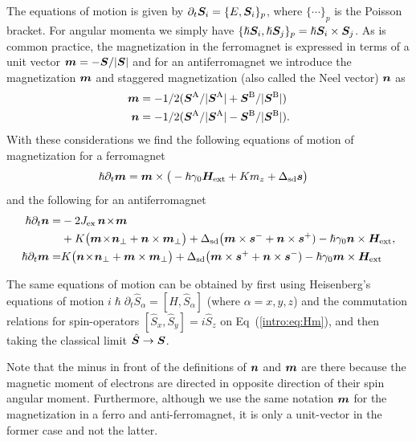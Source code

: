 The equations of motion is given by $\partial_t \boldsymbol{S}_i = \{E,\boldsymbol{S}_i\}_p$, where $\{\cdots\}_p$ is the Poisson bracket. For angular momenta we simply have $\{\hslash \boldsymbol{S}_i,\hslash \boldsymbol{S}_j\}_p=\hslash \boldsymbol{S}_i\times\boldsymbol{S}_j$. As is common practice, the magnetization in the ferromagnet is expressed in terms of a unit vector $\boldsymbol{m} = -\boldsymbol{S}/|\boldsymbol{S}|$ and for an antiferromagnet we introduce the magnetization $\boldsymbol{m}$ and staggered magnetization (also called the Neel vector) $\boldsymbol{n}$ as
\begin{align}
 	\boldsymbol{m}&=-1/2(\boldsymbol{S}^\text{A}/|\boldsymbol{S}^\text{A}|+\boldsymbol{S}^\text{B}/|\boldsymbol{S}^\text{B}|)\\
    \boldsymbol{n}&=-1/2(\boldsymbol{S}^\text{A}/|\boldsymbol{S}^\text{A}|-\boldsymbol{S}^\text{B}/|\boldsymbol{S}^\text{B}|).
\end{align} 
With these considerations we find the following equations of motion of magnetization for a ferromagnet
\begin{align}
	\hslash \partial_t \boldsymbol{m} &= \boldsymbol{m}\times\big(-\hslash\gamma_0\boldsymbol{H}_\text{ext}+Km_z+\Delta_\text{sd}\boldsymbol{s}\big)
	\label{intro:eq:S1}
\end{align}
and the following for an antiferromagnet
\begin{align}
\hslash \partial_t \boldsymbol{n} =& -2J_\text{ex}\, \boldsymbol{n}\!\times\!\boldsymbol{m} \nonumber\\
    & + K \big(\boldsymbol{m}\!\times\!\boldsymbol{n}_\perp+\boldsymbol{n}\times\boldsymbol{m}_\perp\big) 
	+ \Delta_\text{sd} \big(\boldsymbol{m}\times\boldsymbol{s}^-+\boldsymbol{n}\times\boldsymbol{s}^+) -\hslash\gamma_0\boldsymbol{n}\times\boldsymbol{H}_\text{ext},\\
\hslash \partial_t \boldsymbol{m} =&K  \big(\boldsymbol{n}\!\times\!\boldsymbol{n}_\perp+\boldsymbol{m}\times\boldsymbol{m}_\perp\big) 
	+ \Delta_\text{sd} \big(\boldsymbol{m}\times\boldsymbol{s}^++\boldsymbol{n}\times\boldsymbol{s}^-)-\hslash\gamma_0\boldsymbol{m}\times\boldsymbol{H}_\text{ext}
	\label{eq:sd:neel}
\end{align}

The same equations of motion can be obtained by first using Heisenberg's equations of motion $i \hslash\partial_t \hat{S}_\alpha = [H,\hat{S}_\alpha]$ (where $\alpha=x,y,z$) and the commutation relations for spin-operators $[\hat{S}_x, \hat{S}_y]=i\hat{S}_z$ on Eq~(\ref{intro:eq:Hm}), and then taking the classical limit $\hat{\boldsymbol{S}}\rightarrow \boldsymbol{S}$. 

Note that the minus in front of the definitions of $\boldsymbol{n}$ and $\boldsymbol{m}$ are there because the magnetic moment of electrons are directed in opposite direction of their spin angular moment. Furthermore, although we use the same notation $\boldsymbol{m}$ for the magnetization in a ferro and anti-ferromagnet, it is only a unit-vector in the former case and not the latter. 

